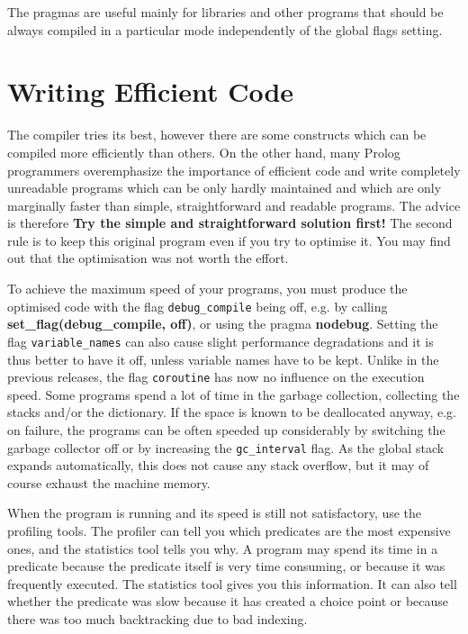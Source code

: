 The pragmas are  useful mainly for libraries and other programs
that should be always compiled in a particular mode
independently of the global flags setting.

\section{Writing Efficient Code}
\label{secefficientcode}
The {\eclipse} compiler tries its best, however there are some
constructs which can be compiled more efficiently than others.
On the other hand, many Prolog programmers overemphasize
the importance of efficient code and write completely unreadable
programs which can be only hardly maintained and which are only
marginally faster than simple, straightforward and readable
programs.
The advice is therefore {\bf Try the simple and straightforward
solution first!}
The second rule is to keep this original program even if you try
to optimise it. You may find out that the optimisation
was not worth the effort.

To achieve the maximum speed of your programs, you must
produce the optimised code with the flag {\tt debug_compile}
being off, e.g. 
by calling {\bf set_flag(debug_compile, off)},
or using the pragma {\bf nodebug}.
Setting the flag {\tt variable_names} can also cause slight
performance degradations and it is thus better to have
it off, unless variable names have to be kept.
Unlike in the previous releases, the flag {\tt coroutine}
has now no influence on the execution speed.
Some programs spend a lot of time in the garbage collection,
collecting the stacks and/or the dictionary.
If the space is known to be deallocated anyway, e.g. on failure,
the programs can be often speeded up considerably
by switching the garbage collector off or by increasing
the {\tt gc_interval} flag.
As the global stack expands automatically, this does not cause
any stack overflow, but it may of course exhaust the machine memory.

When the program is running and its speed is still
not satisfactory, use the profiling tools.
The profiler can tell you which predicates
are the most expensive ones, and the statistics tool
tells you why.
A program may spend its time in a predicate because the predicate
itself is very time consuming, or because it was frequently executed.
The statistics tool gives you this information.
It can also tell whether the predicate was slow because it
has created a choice point or because there was too much
backtracking due to bad indexing.

